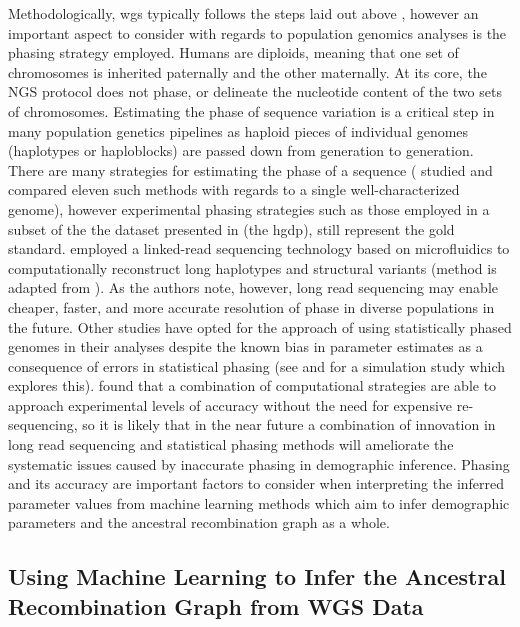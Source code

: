 Methodologically, \gls{wgs} typically follows the steps laid out above , however an important aspect to consider with regards to population genomics analyses is the phasing strategy employed. Humans are diploids, meaning that one set of chromosomes is inherited paternally and the other maternally. At its core, the NGS protocol does not phase, or delineate the nucleotide content of the two sets of chromosomes. Estimating the phase of sequence variation is a critical step in many population genetics pipelines as haploid pieces of individual genomes (haplotypes or haploblocks) are passed down from generation to generation. There are many strategies for estimating the phase of a sequence (\textcite{Choi2018} studied and compared eleven such methods with regards to a single well-characterized genome), however experimental phasing strategies such as those employed in a subset of the the dataset presented in \textcite{Bergstrom2019} (the \gls{hgdp}), still represent the gold standard. \textcite{Bergstrom2019} employed a linked-read sequencing technology based on microfluidics to computationally reconstruct long haplotypes and structural variants (method is adapted from \cite{GX2016}). As the authors note, however, long read sequencing may enable cheaper, faster, and more accurate resolution of phase in diverse populations in the future. Other studies have opted for the approach of using statistically phased genomes in their analyses despite the known bias in parameter estimates as a consequence of errors in statistical phasing (see \textcite[Supplemental section 7]{Steinrucken2019} and \textcite{Raghavan2015a} for a simulation study which explores this). \textcite{Choi2018} found that a combination of computational strategies are able to approach experimental levels of accuracy without the need for expensive re-sequencing, so it is likely that in the near future a combination of innovation in long read sequencing and statistical phasing methods will ameliorate the systematic issues caused by inaccurate phasing in demographic inference. Phasing and its accuracy are important factors to consider when interpreting the inferred parameter values from machine learning methods which aim to infer demographic parameters and the ancestral recombination graph as a whole.

\subsection{Using Machine Learning to Infer the Ancestral Recombination Graph from WGS Data}

